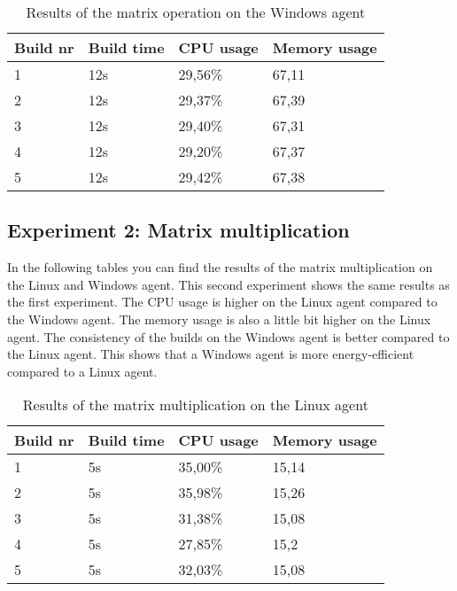 \begin{table}[H]
\centering
\begin{tabular}{|l|l|l|l|}
\hline
Build nr & Build time & CPU usage & Memory usage \\ \hline
1        & 12s        & 29,56\%   & 67,11       \\ \hline
2        & 12s        & 29,37\%   & 67,39       \\ \hline
3        & 12s        & 29,40\%   & 67,31       \\ \hline
4        & 12s        & 29,20\%   & 67,37       \\ \hline
5        & 12s        & 29,42\%   & 67,38       \\ \hline
\end{tabular}
\caption{Results of the matrix operation on the Windows agent}
\end{table}

\subsection{Experiment 2: Matrix multiplication}
In the following tables you can find the results of the matrix multiplication on the Linux and Windows agent. This second experiment shows the same results as the first experiment. The CPU usage is higher on the Linux agent compared to the Windows agent. The memory usage is also a little bit higher on the Linux agent. The consistency of the builds on the Windows agent is better compared to the Linux agent. This shows that a Windows agent is more energy-efficient compared to a Linux agent.
\begin{table}[H]
\centering
\begin{tabular}{|l|l|l|l|}
\hline
Build nr & Build time & CPU usage & Memory usage \\ \hline
1        & 5s         & 35,00\%   & 15,14       \\ \hline
2        & 5s         & 35,98\%   & 15,26       \\ \hline
3        & 5s         & 31,38\%   & 15,08       \\ \hline
4        & 5s         & 27,85\%   & 15,2        \\ \hline
5        & 5s         & 32,03\%   & 15,08       \\ \hline
\end{tabular}
\caption{Results of the matrix multiplication on the Linux agent}
\end{table}

